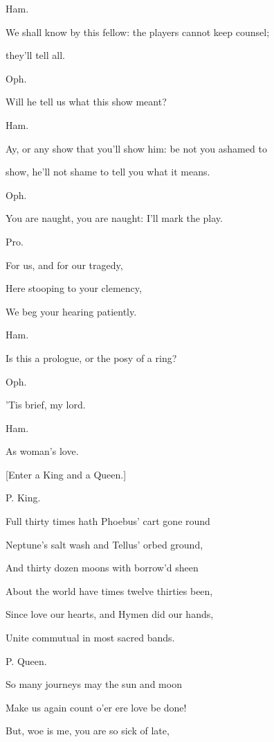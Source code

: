 \documentclass[12pt]{book}
\begin{document}
Ham.

We shall know by this fellow: the players cannot keep counsel;

they'll tell all.



Oph.

Will he tell us what this show meant?



Ham.

Ay, or any show that you'll show him: be not you ashamed to

show, he'll not shame to tell you what it means.



Oph.

You are naught, you are naught: I'll mark the play.



Pro.

   For us, and for our tragedy,

   Here stooping to your clemency,

   We beg your hearing patiently.



Ham.

Is this a prologue, or the posy of a ring?



Oph.

'Tis brief, my lord.



Ham.

As woman's love.



[Enter a King and a Queen.]



P. King.

Full thirty times hath Phoebus' cart gone round

Neptune's salt wash and Tellus' orbed ground,

And thirty dozen moons with borrow'd sheen

About the world have times twelve thirties been,

Since love our hearts, and Hymen did our hands,

Unite commutual in most sacred bands.



P. Queen.

So many journeys may the sun and moon

Make us again count o'er ere love be done!

But, woe is me, you are so sick of late,
\end{document}
